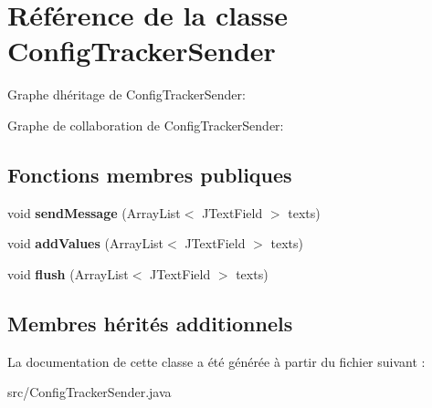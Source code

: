 \hypertarget{classConfigTrackerSender}{}\section{Référence de la classe Config\+Tracker\+Sender}
\label{classConfigTrackerSender}


Graphe d\textquotesingle{}héritage de Config\+Tracker\+Sender\+:


Graphe de collaboration de Config\+Tracker\+Sender\+:
\subsection*{Fonctions membres publiques}
\begin{DoxyCompactItemize}
\item 
\mbox{\label{classConfigTrackerSender_a6c01f3fad0a01c734f6c13dd86590c56}} 
void {\bfseries send\+Message} (Array\+List$<$ J\+Text\+Field $>$ texts)
\item 
\mbox{\label{classConfigTrackerSender_aeb35dde7665cb2a62363395875014984}} 
void {\bfseries add\+Values} (Array\+List$<$ J\+Text\+Field $>$ texts)
\item 
\mbox{\label{classConfigTrackerSender_a750aceddacd3204efd767bdbdac0997a}} 
void {\bfseries flush} (Array\+List$<$ J\+Text\+Field $>$ texts)
\end{DoxyCompactItemize}
\subsection*{Membres hérités additionnels}


La documentation de cette classe a été générée à partir du fichier suivant \+:\begin{DoxyCompactItemize}
\item 
src/Config\+Tracker\+Sender.\+java\end{DoxyCompactItemize}
